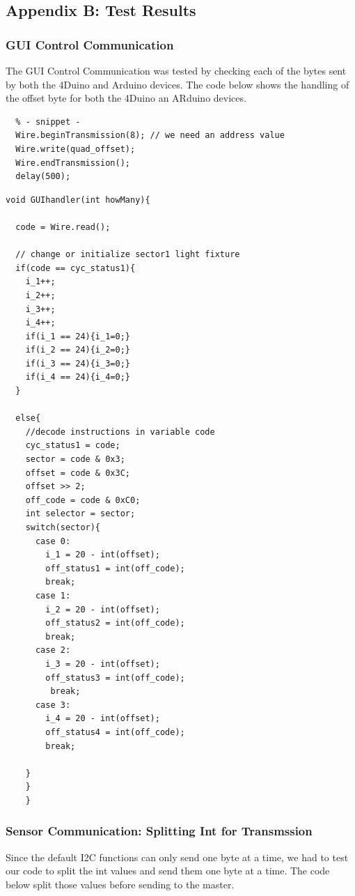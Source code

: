 \documentclass[12pt,a4paper]{report}
\begin{document}
\subsection{Appendix B: Test Results}

\subsubsection{GUI Control Communication}
The GUI Control Communication was tested by checking each of the bytes sent by both the 4Duino and Arduino devices. The code below shows the handling of the offset byte for both the 4Duino an ARduino devices.

\begin{lstlisting}
  % - snippet -
  Wire.beginTransmission(8); // we need an address value
  Wire.write(quad_offset);
  Wire.endTransmission();
  delay(500);
\end{lstlisting}

\begin{lstlisting}
void GUIhandler(int howMany){

  code = Wire.read();

  // change or initialize sector1 light fixture
  if(code == cyc_status1){
    i_1++;
    i_2++;
    i_3++;
    i_4++;
    if(i_1 == 24){i_1=0;}
    if(i_2 == 24){i_2=0;}
    if(i_3 == 24){i_3=0;}
    if(i_4 == 24){i_4=0;}
  }

  else{
    //decode instructions in variable code
    cyc_status1 = code;
    sector = code & 0x3;
    offset = code & 0x3C;
    offset >> 2;
    off_code = code & 0xC0;
    int selector = sector;
    switch(sector){
      case 0:
      	i_1 = 20 - int(offset);
      	off_status1 = int(off_code);
      	break;
      case 1:
      	i_2 = 20 - int(offset);
      	off_status2 = int(off_code);
      	break;
      case 2:
      	i_3 = 20 - int(offset);
      	off_status3 = int(off_code);
     	 break;
      case 3:
      	i_4 = 20 - int(offset);
      	off_status4 = int(off_code);
      	break;

    }
    }
	}
\end{lstlisting}

\subsubsection{Sensor Communication: Splitting Int for Transmssion}
Since the default I2C functions can only send one byte at a time, we had to test our code to split the int values and send them one byte at a time. The code below split those values before sending to the master.
\end{document}
